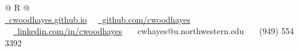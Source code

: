 \documentclass[letterpaper,10pt]{article}
\begin{document}
\pagestyle{empty} 


\begin{tabularx}{\linewidth}{@{} R @{}}
\textcolor{titlecolor}{} \\[5pt]
{\fontsize{9.1pt}{11pt}\selectfont
\href{https://cwoodhayes.github.io}{\raisebox{-0.05\height}\faGlobe\ cwoodhayes.github.io} \ \ 
\href{https://github.com/cwoodhayes}{\raisebox{-0.05\height}\faGithub\ github.com/cwoodhayes} \ \ 
\href{https://linkedin.com/in/cwoodhayes}{\raisebox{-0.05\height}\faLinkedin\ linkedin.com/in/cwoodhayes} \ \ 
\raisebox{-0.05\height}\faEnvelope \ cwhayes@u.northwestern.edu \ \ 
\raisebox{-0.05\height}\faPhone\ (949) 554 3392 \ \ 
} \\
\end{tabularx}



\end{document}
